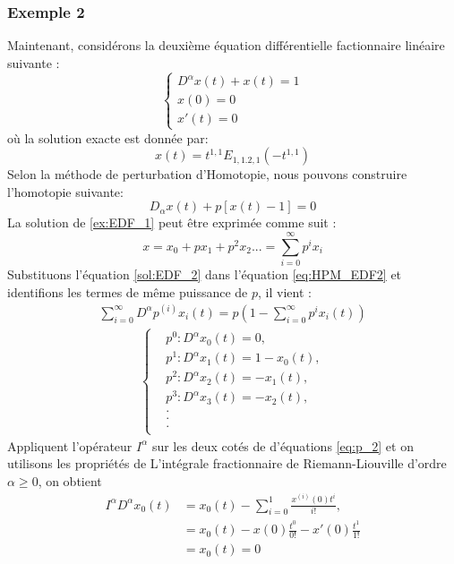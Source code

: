 \subsubsection*{Exemple 2}
Maintenant, considérons la deuxième équation différentielle factionnaire linéaire suivante :
\begin{equation}\label{ex:EDF_2}
    \begin{cases}
        D^{\alpha} x(t) +x(t) = 1\\
        x(0)=0\\
        x'(t) =0
    \end{cases}
\end{equation}
où la solution exacte est donnée par:
\begin{equation}
    x(t)=t^{1,1} E_{1,1. 2,1} (-t^{1,1})
\end{equation}
Selon la méthode de perturbation d'Homotopie, nous pouvons construire l'homotopie suivante:
\begin{equation} \label{eq:HPM_EDF2}
    D_{\alpha} x(t) +p\left[x(t)-1\right]=0
\end{equation}
La solution de \ref{ex:EDF_1} peut être exprimée comme suit :
\begin{equation}\label{sol:EDF_2}
    x=x_0 + px_1 + p^2x_2 ... = \sum _{i=0}^{\infty} p^i x_i
\end{equation}
Substituons l'équation \ref{sol:EDF_2} dans l'équation \ref{eq:HPM_EDF2} et identifions les termes de même puissance de $p$, il vient :
\begin{align*}
    \sum_{i=0}^{\infty} D^{\alpha} p^{(i)}x_i(t) = p\left(1-\sum_{i=0}^{\infty} p^{i}x_i (t) \right)
\end{align*}
\begin{align}\label{eq:p_2}
\begin{cases}
    & p^0 : D^{\alpha}x_0(t)=0, \\
    & p^1 : D^{\alpha}x_1(t) = 1 -x_0(t),\\
    & p^2 : D^{\alpha} x_2(t) = -x_1(t),\\
    & p^3 : D^{\alpha} x_3(t) = -x_2(t),\\
    &     . \\
    &     .\\
    &     .\\
\end{cases}
\end{align}
Appliquent l'opérateur $I^{\alpha}$ sur les deux cotés de d'équations \ref{eq:p_2} et on utilisons les propriétés de L'intégrale fractionnaire de Riemann-Liouville d'ordre $\alpha \geq 0$, on obtient \begin{align*}
    I^\alpha D^{\alpha} x_0(t) &= x_0(t)-\sum_{i=0}^1 \frac{x^{(i)}(0) t^i}{i!},\\
    &= x_0(t)-x(0)\frac{t^0}{0!}-x'(0)\frac{t^1}{1!}\\
    &= x_0(t) = 0
\end{align*}
